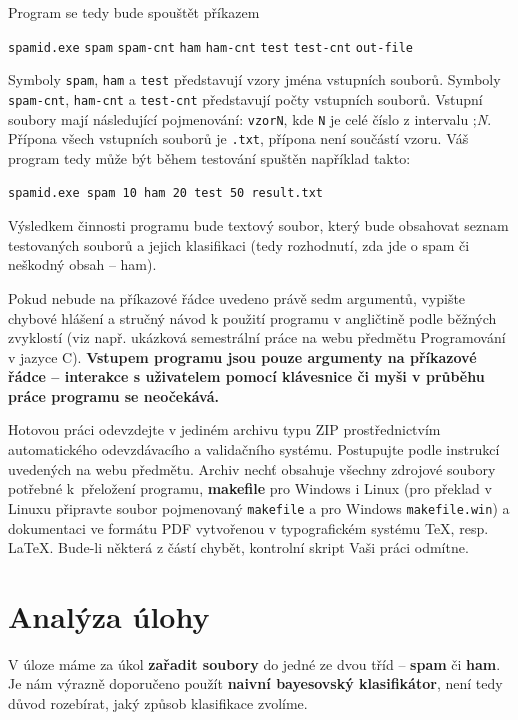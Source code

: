 \documentclass[12pt]{report}
\newcommand\la{\textlangle}  					%
\newcommand\ra{\textrangle}						%
\newcommand\laratexttt[1]{\la\texttt{#1}\ra}	%
\newcommand\indentt[1]{						
	\setlength\parindent{5mm}
	#1
	\setlength\parindent{0mm}
	}											%
\begin{document}
	Program se tedy bude spouštět příkazem
	
	\indentt{\texttt{spamid.exe} \laratexttt{spam} \laratexttt{spam-cnt} \laratexttt{ham} \laratexttt{ham-cnt} \laratexttt{test} \laratexttt{test-cnt} \laratexttt{out-file}$\,$\keys{\return}}
	
	Symboly \laratexttt{spam}, \laratexttt{ham} a \laratexttt{test} představují vzory jména vstupních souborů. Symboly \laratexttt{spam-cnt}, \laratexttt{ham-cnt} a \laratexttt{test-cnt} představují počty vstupních souborů. Vstupní soubory mají následující pojmenování: \texttt{vzorN}, kde \texttt{N} je celé číslo z intervalu \la1;\textit{N}\ra. Přípona všech vstupních souborů je \texttt{.txt}, přípona není součástí vzoru. Váš program tedy může být během testování spuštěn například takto:
	
	\indentt{
	\texttt{spamid.exe spam 10 ham 20 test 50 result.txt}$\,$\keys{\return}
	}
	
	Výsledkem činnosti programu bude textový soubor, který bude obsahovat seznam testovaných souborů a jejich klasifikaci (tedy rozhodnutí, zda jde o spam či neškodný obsah – ham).
	
	Pokud nebude na příkazové řádce uvedeno právě sedm argumentů, vypište chybové hlášení a stručný návod k použití programu v angličtině podle běžných zvyklostí (viz např. ukázková semestrální práce na webu předmětu Programování v jazyce C). \textbf{Vstupem programu jsou pouze argumenty na příkazové řádce – interakce s uživatelem pomocí klávesnice či myši v průběhu práce programu se neočekává.}
	
	Hotovou práci odevzdejte v jediném archivu typu ZIP prostřednictvím automatického odevzdávacího a validačního systému. Postupujte podle instrukcí uvedených na webu předmětu. Archiv nechť obsahuje všechny zdrojové soubory potřebné k~přeložení programu, \textbf{makefile} pro Windows i Linux (pro překlad v Linuxu připravte soubor pojmenovaný \texttt{makefile} a pro Windows \texttt{makefile.win}) a dokumentaci ve formátu PDF vytvořenou v typografickém systému \TeX, resp. \LaTeX. Bude-li některá z částí chybět, kontrolní skript Vaši práci odmítne.

	\chapter{Analýza úlohy}
	V úloze máme za úkol \textbf{zařadit soubory} do jedné ze dvou tříd – \textbf{spam} či \textbf{ham}. Je nám výrazně doporučeno použít \textbf{naivní bayesovský klasifikátor}, není tedy důvod rozebírat, jaký způsob klasifikace zvolíme.
	
\end{document}
